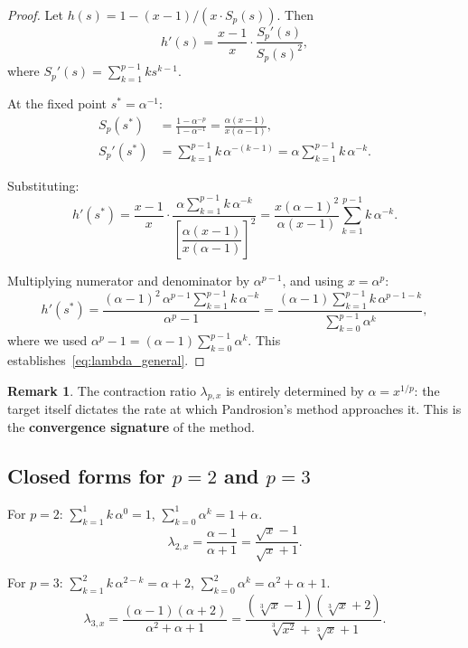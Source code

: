 \documentclass[11pt,a4paper]{article}
\theoremstyle{definition}
\newtheorem{remark}{Remark}[section]
\newcommand{\cbrt}[1]{\sqrt[3]{#1}}
\begin{document}
\begin{proof}
Let $h(s) = 1 - (x-1)/(x \cdot S_p(s))$. Then
\[
  h'(s) = \frac{x-1}{x} \cdot \frac{S_p'(s)}{S_p(s)^2},
\]
where $S_p'(s) = \sum_{k=1}^{p-1} k s^{k-1}$.

At the fixed point $s^* = \alpha^{-1}$:
\begin{align*}
  S_p(s^*) &= \frac{1 - \alpha^{-p}}{1 - \alpha^{-1}} = \frac{\alpha(x-1)}{x(\alpha-1)}, \\
  S_p'(s^*) &= \sum_{k=1}^{p-1} k\,\alpha^{-(k-1)} = \alpha \sum_{k=1}^{p-1} k\,\alpha^{-k}.
\end{align*}

Substituting:
\[
  h'(s^*) = \frac{x-1}{x} \cdot \frac{\alpha \sum_{k=1}^{p-1} k\,\alpha^{-k}}{\left[\dfrac{\alpha(x-1)}{x(\alpha-1)}\right]^2}
  = \frac{x(\alpha-1)^2}{\alpha(x-1)} \sum_{k=1}^{p-1} k\,\alpha^{-k}.
\]

Multiplying numerator and denominator by $\alpha^{p-1}$, and using $x = \alpha^p$:
\[
  h'(s^*) = \frac{(\alpha-1)^2\,\alpha^{p-1}\sum_{k=1}^{p-1}k\,\alpha^{-k}}{\alpha^p - 1}
  = \frac{(\alpha-1)\sum_{k=1}^{p-1}k\,\alpha^{p-1-k}}{\sum_{k=0}^{p-1}\alpha^k},
\]
where we used $\alpha^p - 1 = (\alpha-1)\sum_{k=0}^{p-1}\alpha^k$. This establishes~\eqref{eq:lambda_general}.
\end{proof}

\begin{remark}
The contraction ratio $\lambda_{p,x}$ is entirely determined by $\alpha = x^{1/p}$: the target itself dictates the rate at which Pandrosion's method approaches it. This is the \textbf{convergence signature} of the method.
\end{remark}

\subsection{Closed forms for \texorpdfstring{$p=2$}{p=2} and \texorpdfstring{$p=3$}{p=3}}

For $p = 2$: $\sum_{k=1}^{1} k\,\alpha^{0} = 1$, $\sum_{k=0}^{1}\alpha^k = 1 + \alpha$.
\begin{equation}
  \label{eq:lambda2}
  \lambda_{2,x} = \frac{\alpha - 1}{\alpha + 1} = \frac{\sqrt{x} - 1}{\sqrt{x} + 1}.
\end{equation}

For $p = 3$: $\sum_{k=1}^{2} k\,\alpha^{2-k} = \alpha + 2$, $\sum_{k=0}^{2}\alpha^k = \alpha^2+\alpha+1$.
\begin{equation}
  \label{eq:lambda3}
  \lambda_{3,x} = \frac{(\alpha-1)(\alpha+2)}{\alpha^2 + \alpha + 1} = \frac{(\cbrt{x}-1)(\cbrt{x}+2)}{\cbrt{x^2}+\cbrt{x}+1}.
\end{equation}
\end{document}
